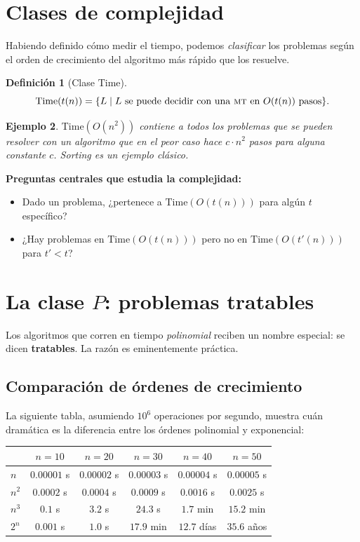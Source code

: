 \documentclass[11pt,a4paper]{article}
\theoremstyle{definicion}
\newtheorem{definicion}{Definición}[section]
\newtheorem{ejemplo}[definicion]{Ejemplo}
\newcommand{\MT}{\textsc{mt}}
\begin{document}
\section{Clases de complejidad}

Habiendo definido cómo medir el tiempo, podemos \emph{clasificar} los problemas según el orden de crecimiento del algoritmo más rápido que los resuelve.

\begin{definicion}[Clase $\mathrm{Time}$]
\[
\mathrm{Time}(t(n)) = \{ L \mid L \text{ se puede decidir con una \MT\ en } O(t(n)) \text{ pasos}\}.
\]
\end{definicion}

\begin{ejemplo}
$\mathrm{Time}(O(n^2))$ contiene a todos los problemas que se pueden resolver con un algoritmo que en el peor caso hace $c \cdot n^2$ pasos para alguna constante $c$. Sorting es un ejemplo clásico.
\end{ejemplo}

\textbf{Preguntas centrales que estudia la complejidad:}
\begin{itemize}
    \item Dado un problema, ¿pertenece a $\mathrm{Time}(O(t(n)))$ para algún $t$ específico?
    \item ¿Hay problemas en $\mathrm{Time}(O(t(n)))$ pero no en $\mathrm{Time}(O(t'(n)))$ para $t' < t$?
\end{itemize}

\section{La clase $P$: problemas tratables}

Los algoritmos que corren en tiempo \emph{polinomial} reciben un nombre especial: se dicen \textbf{tratables}. La razón es eminentemente práctica.

\subsection{Comparación de órdenes de crecimiento}

La siguiente tabla, asumiendo $10^6$ operaciones por segundo, muestra cuán dramática es la diferencia entre los órdenes polinomial y exponencial:

\begin{center}
\begin{tabular}{lccccc}
\toprule
 & $n=10$ & $n=20$ & $n=30$ & $n=40$ & $n=50$ \\
\midrule
$n$    & $0.00001$ s & $0.00002$ s & $0.00003$ s & $0.00004$ s & $0.00005$ s \\
$n^2$  & $0.0002$ s  & $0.0004$ s  & $0.0009$ s  & $0.0016$ s  & $0.0025$ s \\
$n^3$  & $0.1$ s     & $3.2$ s     & $24.3$ s    & $1.7$ min   & $15.2$ min \\
$2^n$  & $0.001$ s   & $1.0$ s     & $17.9$ min  & $12.7$ días & $35.6$ años \\
\bottomrule
\end{tabular}
\end{center}
\end{document}
